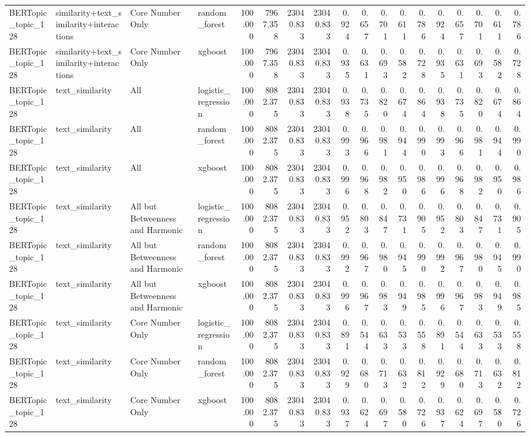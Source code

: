 \begin{tabular}{llllrrrrrrrrrrrrrr}
BERTopic\_topic\_128 & similarity+text\_similarity+interactions & Core Number Only & random\_forest & 100.000 & 7967.358 & 23040.833 & 23040.833 & 0.924 & 0.657 & 0.701 & 0.611 & 0.786 & 0.924 & 0.657 & 0.701 & 0.611 & 0.786 \\
BERTopic\_topic\_128 & similarity+text\_similarity+interactions & Core Number Only & xgboost & 100.000 & 7967.358 & 23040.833 & 23040.833 & 0.935 & 0.631 & 0.693 & 0.582 & 0.728 & 0.935 & 0.631 & 0.693 & 0.582 & 0.728 \\
BERTopic\_topic\_128 & text\_similarity & All & logistic\_regression & 100.000 & 8082.375 & 23040.833 & 23040.833 & 0.938 & 0.735 & 0.820 & 0.674 & 0.864 & 0.938 & 0.735 & 0.820 & 0.674 & 0.864 \\
BERTopic\_topic\_128 & text\_similarity & All & random\_forest & 100.000 & 8082.375 & 23040.833 & 23040.833 & 0.993 & 0.966 & 0.981 & 0.944 & 0.990 & 0.993 & 0.966 & 0.981 & 0.944 & 0.990 \\
BERTopic\_topic\_128 & text\_similarity & All & xgboost & 100.000 & 8082.375 & 23040.833 & 23040.833 & 0.996 & 0.968 & 0.982 & 0.950 & 0.986 & 0.996 & 0.968 & 0.982 & 0.950 & 0.986 \\
BERTopic\_topic\_128 & text\_similarity & All but Betweenness and Harmonic & logistic\_regression & 100.000 & 8082.375 & 23040.833 & 23040.833 & 0.952 & 0.803 & 0.847 & 0.731 & 0.905 & 0.952 & 0.803 & 0.847 & 0.731 & 0.905 \\
BERTopic\_topic\_128 & text\_similarity & All but Betweenness and Harmonic & random\_forest & 100.000 & 8082.375 & 23040.833 & 23040.833 & 0.992 & 0.967 & 0.980 & 0.945 & 0.990 & 0.992 & 0.967 & 0.980 & 0.945 & 0.990 \\
BERTopic\_topic\_128 & text\_similarity & All but Betweenness and Harmonic & xgboost & 100.000 & 8082.375 & 23040.833 & 23040.833 & 0.996 & 0.967 & 0.983 & 0.949 & 0.985 & 0.996 & 0.967 & 0.983 & 0.949 & 0.985 \\
BERTopic\_topic\_128 & text\_similarity & Core Number Only & logistic\_regression & 100.000 & 8082.375 & 23040.833 & 23040.833 & 0.891 & 0.544 & 0.633 & 0.533 & 0.558 & 0.891 & 0.544 & 0.633 & 0.533 & 0.558 \\
BERTopic\_topic\_128 & text\_similarity & Core Number Only & random\_forest & 100.000 & 8082.375 & 23040.833 & 23040.833 & 0.929 & 0.680 & 0.713 & 0.632 & 0.812 & 0.929 & 0.680 & 0.713 & 0.632 & 0.812 \\
BERTopic\_topic\_128 & text\_similarity & Core Number Only & xgboost & 100.000 & 8082.375 & 23040.833 & 23040.833 & 0.937 & 0.624 & 0.697 & 0.580 & 0.726 & 0.937 & 0.624 & 0.697 & 0.580 & 0.726 \\

\end{tabular}
